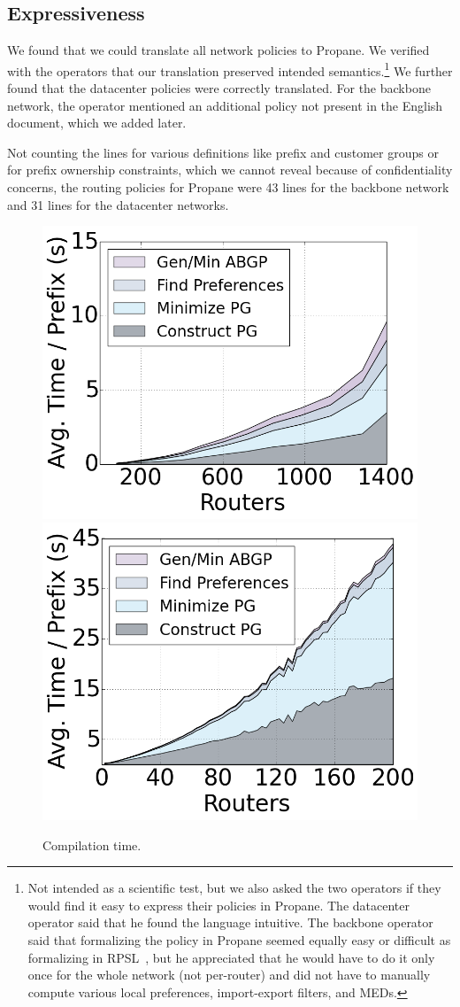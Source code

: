 \documentclass[10pt]{sigalternate052015}
\newcommand{\sysname}{{\small \sf Propane}\xspace}
\begin{document}
\subsection{Expressiveness}

We found that we could translate all network policies to \sysname. We verified with the operators that our translation preserved intended semantics.\footnote{Not intended as a scientific test, but we also asked the two operators if they would find it easy to express their policies in \sysname. The datacenter operator said that he found the language intuitive. The backbone operator said that formalizing the policy in \sysname seemed equally easy or difficult as formalizing in RPSL~\cite{RFC2622}, but he appreciated that he would have to do it only once for the whole network (not per-router) and did not have to manually compute various local preferences, import-export filters, and MEDs.} We further found that the datacenter policies were correctly translated. For the backbone network, the operator mentioned an additional policy not present in the English document, which we added later.

Not counting the lines for various definitions like prefix and customer groups or for prefix ownership constraints, which we cannot reveal because of confidentiality concerns, the routing policies for \sysname were 43 lines for the backbone network and 31 lines for the datacenter networks.


\begin{figure}
    {\includegraphics[width=.49\columnwidth]{figures/compilation-times-dc.png}}
    {\includegraphics[width=.49\columnwidth]{figures/compilation-times-backbone.png}} \\
  \caption{Compilation time. \label{fig:compilation-times}}
  \vspace{-1em}
\end{figure}
\end{document}
